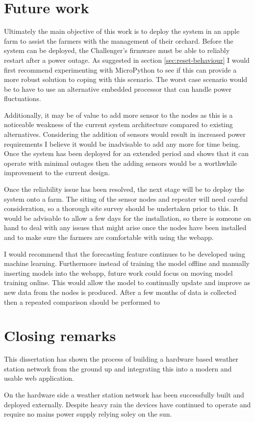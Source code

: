 \section{Future work}\label{sec:future-work}

Ultimately the main objective of this work is to deploy the system in an apple
farm to assist the farmers with the management of their orchard. Before the
system can be deployed, the Challenger's firmware must be able to reliably
restart after a power outage.  As suggested in section \ref{sec:reset-behaviour}
I would first recommend experimenting with MicroPython to see if this can
provide a more robust solution to coping with this scenario. The worst case
scenario would be to have to use an alternative embedded processor that can
handle power fluctuations.

Additionally, it may be of value to add more sensor to the nodes as this is a
noticeable weakness of the current system architecture compared to existing
alternatives. Considering the addition of sensors would result in increased
power requirements I believe it would be inadvisable to add any more for time
being. Once the system has been deployed for an extended period and shows that
it can operate with minimal outages then the adding sensors would be a
worthwhile improvement to the current design.

Once the reliability issue has been resolved, the next stage will be to deploy
the system onto a farm.  The siting of the sensor nodes and repeater will need
careful consideration, so a thorough site survey should be undertaken prior to
this. It would be advisable to allow a few days for the installation, so there
is someone on hand to deal with any issues that might arise once the nodes have
been installed and to make sure the farmers are comfortable with using the
webapp.

I would recommend that the forecasting feature continues to be developed using
machine learning. Furthermore instead of training the model offline and manually
inserting models into the webapp, future work could focus on moving model
training online. This would allow the model to continually update and improve as
new data from the nodes is produced. After a few months of data is collected
then a repeated comparison should be performed to 


\section{Closing remarks}

This dissertation has shown the process of building a hardware based weather
station network from the ground up and integrating this into a modern and usable
web application. 

On the hardware side a weather station network has been successfully built and
deployed externally. Despite heavy rain the devices have continued to operate
and require no mains power supply relying soley on the sun.